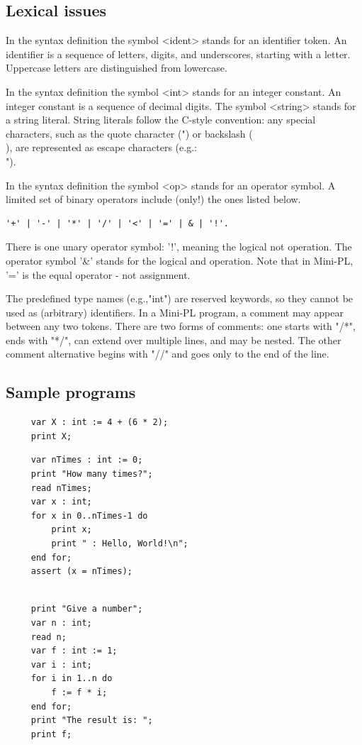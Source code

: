 \documentclass[english,11pt,twoside,a4paper]{article}
\begin{document}
\subsection{Lexical issues}

In the syntax definition the symbol <ident> stands for an identifier token. An identifier is a sequence of letters, digits, and underscores, starting with a letter. Uppercase letters are distinguished from lowercase.
 
In the syntax definition the symbol <int> stands for an integer constant. An integer constant is a sequence of decimal digits. The symbol <string> stands for a string literal. String literals follow the C-style convention: any special characters, such as the quote character (") or backslash (\\), are represented as escape characters (e.g.: \\"). 
 
In the syntax definition the symbol <op> stands for an operator symbol. A limited set of binary operators include (only!) the ones listed below. 
 \begin{lstlisting}
'+' | '-' | '*' | '/' | '<' | '=' | & | '!'. 
 \end{lstlisting}
There is one unary operator symbol: '!', meaning the logical not operation. The operator symbol '\&' stands for the logical and operation. Note that in Mini-PL, '=' is the equal operator - not assignment. 
 
The predefined type names (e.g.,"int") are reserved keywords, so they cannot be used as (arbitrary) identifiers. In a Mini-PL program, a comment may appear between any two tokens. There are two forms of comments: one starts with "/*", ends with "*/", can extend over multiple lines, and may be nested. The other comment alternative begins with "//" and goes only to the end of the line. 


\subsection{Sample programs}
\begin{lstlisting}
     var X : int := 4 + (6 * 2);
     print X;
\end{lstlisting}
\begin{lstlisting}
     var nTimes : int := 0;
     print "How many times?"; 
     read nTimes; 
     var x : int;
     for x in 0..nTimes-1 do 
         print x;
         print " : Hello, World!\n";
     end for;
     assert (x = nTimes);
\end{lstlisting}
\begin{lstlisting}

     print "Give a number"; 
     var n : int;
     read n;
     var f : int := 1;
     var i : int;
     for i in 1..n do 
         f := f * i;
     end for;
     print "The result is: ";
     print f; 
\end{lstlisting}
\end{document}
